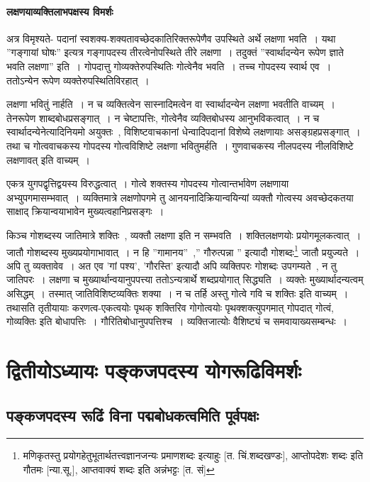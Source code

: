 			\subsubsection{लक्षणयाव्यक्तिलाभपक्षस्य विमर्शः}
			
				अत्र विमृश्यते- पदानां स्वशक्य-शक्यतावच्छेदकातिरिक्तरूपेणैव उपस्थिते अर्थे लक्षणा भवति~।  यथा ”गङ्गायां घोषः” इत्यत्र गङ्गापदस्य तीरत्वेनोपस्थिते तीरे लक्षणा~।  तदुक्तं ”स्वार्थादन्येन रूपेण  ज्ञाते भवति लक्षणा” इति~।  गोपदात्तु गोव्यक्तेरुपस्थितिः गोत्वेनैव भवति~।  तच्च गोपदस्य स्वार्थ एव~। ततोऽन्येन  रूपेण व्यक्तेरुपस्थितिविरहात्~।

				लक्षणा भवितुं नार्हति~। न च व्यक्तित्वेन सास्नादिमत्वेन वा स्वार्थादन्येन लक्षणा भवतीति वाच्यम्~।  तेनरूपेण शाब्दबोधप्रसङ्गात्~।  न चेष्टापत्तिः, गोत्वेनैव व्यक्तिबोधस्य आनुभविकत्वात्~।  न च स्वार्थादन्येनेत्यादिनियमो अयुक्तः~, विशिष्टवाचकानां धेन्वादिपदानां विशेष्ये लक्षणायाः असङ्ग्रहप्रसङ्गात्~।  तथा च गोत्ववाचकस्य  गोपदस्य गोत्वविशिष्टे लक्षणा भवितुमर्हति~।  गुणवाचकस्य नीलपदस्य नीलविशिष्टे लक्षणावत् इति वाच्यम्~। 

				एकत्र युगपद्वृत्तिद्वयस्य विरुद्धत्वात्~।  गोत्वे शक्तस्य गोपदस्य गोत्वान्तर्भावेण लक्षणाया अभ्युपगमासम्भवात्~।  व्यक्तिमात्रे लक्षणोपगमे तु  आनयनादिक्रियान्वयिन्यां व्यक्तौ गोत्वस्य अवच्छेदकतया साक्षाद् क्रियान्वयाभावेन मुख्यत्वहानिप्रसङ्गः~। 

				किञ्च गोशब्दस्य जातिमात्रे शक्तिः~, व्यक्तौ लक्षणा इति न सम्भवति~।  शक्तिलक्षणयोः प्रयोगमूलकत्वात्~।  जातौ गोशब्दस्य मुख्यप्रयोगाभावात्~।  न हि ”गामानय”~,” गौरुत्पन्ना ” इत्यादौ गोशब्दः\footnote{मणिकृतस्तु प्रयोगहेतुभूतार्थतत्त्वज्ञानजन्यः प्रमाणशब्दः इत्याहुः [त. चिं.शब्दखण्डः], आप्तोपदेशः शब्दः इति गौतमः [न्या.सू.], आप्तवाक्यं शब्दः इति अन्नंभट्टः [त. सं]} जातौ प्रयुज्यते~।  अपि तु व्यक्तावेव~।  अत एव ’गां पश्य’, ’गौरस्ति’ इत्यादौ अपि व्यक्तिपरः गोशब्दः उपगम्यते~, न तु जातिपरः~।  लक्षणा च मुख्यार्थान्वयानुपपत्त्या ततोऽन्यत्रार्थे शब्दप्रयोगात् सिद्ध्यति~।  व्यक्तेः मुख्यार्थादन्यत्वम् असिद्धम्~।  तस्मात् जातिविशिष्टव्यक्तिः शक्या~।  न च तर्हि अस्तु गोत्वे गवि च शक्तिः इति वाच्यम्~।  तथासति तृतीयायाः करणत्व-एकत्वयोः पृथक् शक्तिरिव गोगोत्वयोः पृथक्शक्त्युपगमात् गोपदात् गोत्वं, गोव्यक्तिः इति बोधापत्तिः~।  गौरितिबोधानुपपत्तिश्च~।  व्यक्तिजात्योः वैशिष्ट्यं च समवायाख्यसम्बन्धः~।


\chapter{द्वितीयोऽध्यायः पङ्कजपदस्य योगरूढिविमर्शः}

	\section{पङ्कजपदस्य रूढिं विना पद्मबोधकत्वमिति पूर्वपक्षः}

